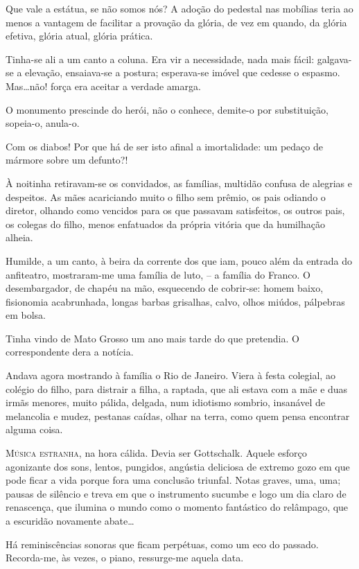 Que vale a estátua, se não somos nós? A
adoção do pedestal nas mobílias teria ao menos a vantagem de facilitar
a provação da glória, de vez em quando, da glória efetiva, glória
atual, glória prática. 

Tinha{}-se ali a um canto a coluna. Era vir a
necessidade, nada mais fácil: galgava{}-se a elevação, ensaiava{}-se a
postura; esperava{}-se imóvel que cedesse o espasmo. Mas\ldots não! força
era aceitar a verdade amarga. 

O monumento prescinde do herói, não o
conhece, demite{}-o por substituição, sopeia{}-o, anula{}-o. 

Com os diabos! Por que há de ser isto afinal a imortalidade: um pedaço de
mármore sobre um defunto?! 

À noitinha retiravam{}-se os convidados, as
famílias, multidão confusa de alegrias e despeitos. As mães acariciando
muito o filho sem prêmio, os pais odiando o diretor, olhando como
vencidos para os que passavam satisfeitos, os outros pais, os colegas
do filho, menos enfatuados da própria vitória que da humilhação alheia.

Humilde, a um canto, à beira da corrente dos que iam, pouco além da
entrada do anfiteatro, mostraram{}-me uma família de luto, -- a
família do Franco. O desembargador, de chapéu na mão, esquecendo de
cobrir{}-se: homem baixo, fisionomia acabrunhada, longas barbas
grisalhas, calvo, olhos miúdos, pálpebras em bolsa. 

Tinha vindo de Mato Grosso um ano mais tarde do que pretendia. 
O correspondente dera a notícia. 

Andava agora mostrando à família o Rio de Janeiro. Viera à
festa colegial, ao colégio do filho, para distrair a filha, a raptada,
que ali estava com a mãe e duas irmãs menores, muito pálida, delgada,
num idiotismo sombrio, insanável de melancolia e mudez, pestanas
caídas, olhar na terra, como quem pensa encontrar alguma coisa. 

\sectionitem

\noindent\textsc{Música estranha}, na hora cálida. Devia ser Gottschalk. Aquele esforço
agonizante dos sons, lentos, pungidos, angústia deliciosa de extremo
gozo em que pode ficar a vida porque fora uma conclusão triunfal. Notas
graves, uma, uma; pausas de silêncio e treva em que o instrumento
sucumbe e logo um dia claro de renascença, que ilumina o mundo como o
momento fantástico do relâmpago, que a escuridão novamente abate\ldots 

Há reminiscências sonoras que ficam perpétuas, como um eco do passado.
Recorda{}-me, às vezes, o piano, ressurge{}-me aquela data. 

